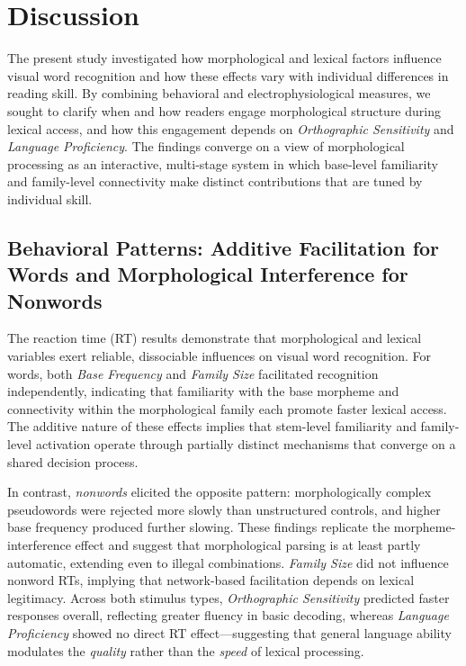 \documentclass[preprint,12pt, authoryear, review]{elsarticle}
\begin{document}
\section{Discussion}

The present study investigated how morphological and lexical factors influence visual word recognition and how these effects vary with individual differences in reading skill. By combining behavioral and electrophysiological measures, we sought to clarify when and how readers engage morphological structure during lexical access, and how this engagement depends on \textit{Orthographic Sensitivity} and \textit{Language Proficiency}. The findings converge on a view of morphological processing as an interactive, multi-stage system in which base-level familiarity and family-level connectivity make distinct contributions that are tuned by individual skill.

\subsection{Behavioral Patterns: Additive Facilitation for Words and Morphological Interference for Nonwords}

The reaction time (RT) results demonstrate that morphological and lexical variables exert reliable, dissociable influences on visual word recognition. For words, both \textit{Base Frequency} and \textit{Family Size} facilitated recognition independently, indicating that familiarity with the base morpheme and connectivity within the morphological family each promote faster lexical access. The additive nature of these effects implies that stem-level familiarity and family-level activation operate through partially distinct mechanisms that converge on a shared decision process. 

In contrast, \textit{nonwords} elicited the opposite pattern: morphologically complex pseudowords were rejected more slowly than unstructured controls, and higher base frequency produced further slowing. These findings replicate the morpheme-interference effect and suggest that morphological parsing is at least partly automatic, extending even to illegal combinations. \textit{Family Size} did not influence nonword RTs, implying that network-based facilitation depends on lexical legitimacy. Across both stimulus types, \textit{Orthographic Sensitivity} predicted faster responses overall, reflecting greater fluency in basic decoding, whereas \textit{Language Proficiency} showed no direct RT effect—suggesting that general language ability modulates the \textit{quality} rather than the \textit{speed} of lexical processing.
\end{document}
